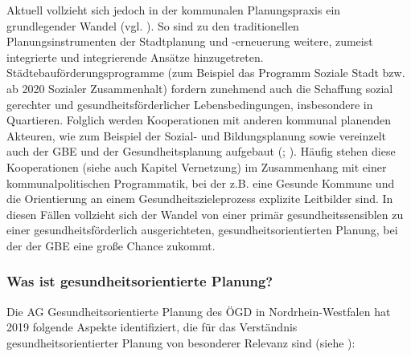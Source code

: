 \documentclass{article}
\begin{document}
Aktuell vollzieht sich jedoch in der kommunalen Planungspraxis ein grundlegender Wandel (vgl. \autocite[9]{ClaßenThomas2020}). So sind zu den traditionellen Planungsinstrumenten der Stadtplanung und -erneuerung weitere, zumeist integrierte und integrierende Ansätze hinzugetreten. Städtebauförderungsprogramme (zum Beispiel das Programm Soziale Stadt bzw. ab 2020 Sozialer Zusammenhalt) fordern zunehmend auch die Schaffung sozial gerechter und gesundheitsförderlicher Lebensbedingungen, insbesondere in Quartieren. Folglich werden Kooperationen mit anderen kommunal planenden Akteuren, wie zum Beispiel der Sozial- und Bildungsplanung sowie vereinzelt auch der GBE und der Gesundheitsplanung aufgebaut (\autocite{BaumgartSabineundweitere2018}; \autocite{BöhmeChristaundweitere2018}). Häufig stehen diese Kooperationen (siehe auch Kapitel Vernetzung) im Zusammenhang mit einer kommunalpolitischen Programmatik, bei der z.B. eine Gesunde Kommune und die Orientierung an einem Gesundheitszieleprozess explizite Leitbilder sind. In diesen Fällen vollzieht sich der Wandel von einer primär gesundheitssensiblen zu einer gesundheitsförderlich ausgerichteten, gesundheitsorientierten Planung, bei der der GBE eine große Chance zukommt. 


\subsubsection{Was ist gesundheitsorientierte Planung?}\label{H1078715}



Die AG Gesundheitsorientierte Planung des ÖGD in Nordrhein-Westfalen hat 2019 folgende Aspekte identifiziert, die für das Verständnis gesundheitsorientierter Planung von besonderer Relevanz sind (siehe \autocite{esÖffentlichenGesundheitsdienstes(ÖGD)inNordrhein-Westfalen(NRW)}):
\end{document}
